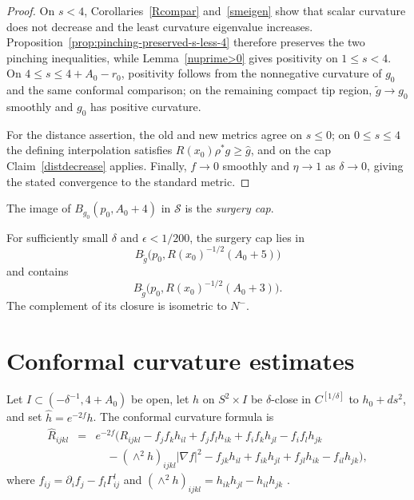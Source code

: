 \begin{proof}
\sketch
On $s<4$, Corollaries~\ref{Rcompar} and~\ref{smeigen} show that scalar
curvature does not decrease and the least curvature eigenvalue increases.
Proposition~\ref{prop:pinching-preserved-s-less-4} therefore preserves the two
pinching inequalities, while Lemma~\ref{nuprime>0} gives positivity on
$1\leq s<4$. On $4\leq s\leq4+A_0-r_0$, positivity follows from the
nonnegative curvature of $g_0$ and the same conformal comparison; on the
remaining compact tip region, $\widetilde g\to g_0$ smoothly and $g_0$ has
positive curvature.

For the distance assertion, the old and new metrics agree on $s\leq0$;
on $0\leq s\leq4$ the defining interpolation satisfies
$R(x_0)\rho^*g\geq\widehat g$, and on the cap Claim~\ref{distdecrease}
applies. Finally, $f\to0$ smoothly and $\eta\to1$ as $\delta\to0$, giving the
stated convergence to the standard metric.
\end{proof}

\begin{definition}
\label{def:surgery-cap}
\label{surgerycap}
The image of $B_{g_0}(p_0,A_0+4)$ in ${\mathcal S}$ is the
\emph{surgery cap}.
\end{definition}

\begin{lemma}
\label{lem:surgery-cap-ball-bounds}
\label{capball}
For sufficiently small $\delta$ and $\epsilon<1/200$, the surgery cap lies in
\[
  B_{\widetilde g}
  \bigl(p_0,R(x_0)^{-1/2}(A_0+5)\bigr)
\]
and contains
\[
  B_{\widetilde g}
  \bigl(p_0,R(x_0)^{-1/2}(A_0+3)\bigr).
\]
The complement of its closure is isometric to $N^-$.
\end{lemma}

\section{Conformal curvature estimates}

Let $I\subset(-\delta^{-1},4+A_0)$ be open, let $h$ on $S^2\times I$ be
$\delta$-close in $C^{[1/\delta]}$ to $h_0+ds^2$, and set
$\widehat h=e^{-2f}h$. The conformal curvature formula is
\begin{eqnarray}
\label{confchange}
\widehat R_{ijkl}
&=&e^{-2f}\bigl(R_{ijkl}-f_jf_kh_{il}+f_jf_lh_{ik}
+f_if_kh_{jl}-f_if_lh_{jk}\\
&&\quad-(\wedge^2h)_{ijkl}|\nabla f|^2-f_{jk}h_{il}+f_{ik}h_{jl}
+f_{jl}h_{ik}-f_{il}h_{jk}\bigr),\nonumber
\end{eqnarray}
where $f_{ij}=\partial_if_j-f_l\Gamma^l_{ij}$ and
$(\wedge^2h)_{ijkl}=h_{ik}h_{jl}-h_{il}h_{jk}$ \cite{Sakai}.

